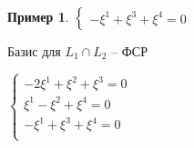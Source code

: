 \documentclass{book}
\theoremstyle{definition}
\newtheorem*{example}{Пример}
\begin{document}
\begin{example}
        $\begin{cases}
            -\xi^1+\xi^3+\xi^4 = 0
        \end{cases}$ 

        Базис для $ L_1\cap L_2$ -- ФСР

        $\begin{cases}
            -2\xi^1+\xi^2+\xi^3 = 0\\
            \xi^1-\xi^2+\xi^4= 0\\
            -\xi^1+\xi^3+\xi^4 = 0\\
        \end{cases}$
    \end{example}
\end{document}
